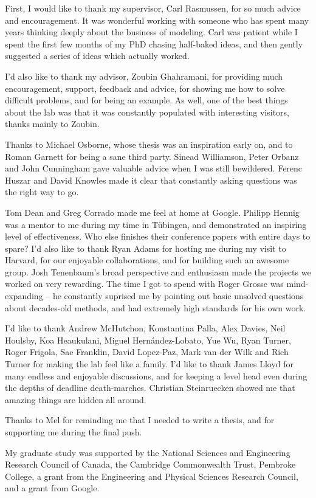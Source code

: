 
\begin{acknowledgements}      


First, I would like to thank my supervisor, Carl Rasmussen, for so much advice and encouragement.
It was wonderful working with someone who has spent many years thinking deeply about the business of modeling.
Carl was patient while I spent the first few months of my PhD chasing half-baked ideas, and then gently suggested a series of ideas which actually worked.

I'd also like to thank my advisor, Zoubin Ghahramani, for providing much encouragement, support, feedback and advice, for showing me how to solve difficult problems, and for being an example.
As well, one of the best things about the lab was that it was constantly populated with interesting visitors, thanks mainly to Zoubin.

Thanks to Michael Osborne, whose thesis was an inspiration early on, and to Roman Garnett for being a sane third party.
Sinead Williamson, Peter Orbanz and John Cunningham gave valuable advice when I was still bewildered.
Ferenc Huszar and David Knowles made it clear that constantly asking questions was the right way to go.

Tom Dean and Greg Corrado made me feel at home at Google.
Philipp Hennig was a mentor to me during my time in T\"{u}bingen, and demonstrated an inspiring level of effectiveness.
Who else finishes their conference papers with entire days to spare?
I'd also like to thank Ryan Adams for hosting me during my visit to Harvard, for our enjoyable collaborations, and for building such an awesome group.
Josh Tenenbaum's broad perspective and enthusiasm made the projects we worked on very rewarding.
The time I got to spend with Roger Grosse was mind-expanding -- he constantly suprised me by pointing out basic unsolved questions about decades-old methods, and had extremely high standards for his own work.

I'd like to thank Andrew McHutchon, Konstantina Palla, Alex Davies, Neil Houlsby, Koa Heaukulani, Miguel Hern\'{a}ndez-Lobato, Yue Wu, Ryan Turner, Roger Frigola, Sae Franklin, David Lopez-Paz, Mark van der Wilk and Rich Turner for making the lab feel like a family.
I'd like to thank James Lloyd for many endless and enjoyable discussions, and for keeping a level head even during the depths of deadline death-marches.
Christian Steinruecken showed me that amazing things are hidden all around.

Thanks to Mel for reminding me that I needed to write a thesis, and for supporting me during the final push.

My graduate study was supported by the National Sciences and Engineering Research Council of Canada, the Cambridge Commonwealth Trust, Pembroke College, a grant from the Engineering and Physical Sciences Research Council, and a grant from Google.

\end{acknowledgements}
